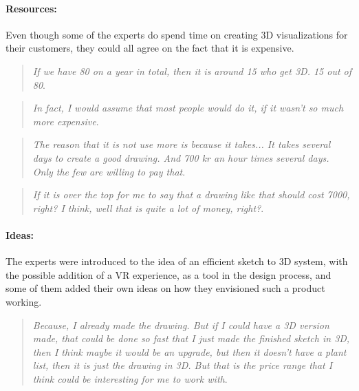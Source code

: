 		\paragraph*{Resources:}
		Even though some of the experts do spend time on creating 3D visualizations for their customers, they could all agree on the fact that it is expensive.\\
		
		\begin{quote}
			\textit{If we have 80 on a year in total, then it is around 15 who get 3D. 15 out of 80}\label{quote:expertRessources1}.\\
		\end{quote}
		
		\begin{quote}
			\textit{In fact, I would assume that most people would do it, if it wasn't so much more expensive}\label{quote:expertRessources2}.\\
		\end{quote}
		
		\begin{quote}
			\textit{The reason that it is not use more is because it takes... It takes several days to create a good drawing. And 700 kr an hour times several days. Only the few are willing to pay that}\label{quote:expertRessources3}.\\
		\end{quote}
		
		\begin{quote}
			\textit{If it is over the top for me to say that a drawing like that should cost 7000, right? I think, well that is quite a lot of money, right?}\label{quote:expertRessources4}.\\
		\end{quote}
		
		\paragraph*{Ideas:}
		The experts were introduced to the idea of an efficient sketch to 3D system, with the possible addition of a VR experience, as a tool in the design process, and some of them added their own ideas on how they envisioned such a product working.\\
		
		\begin{quote}
			\textit{Because, I already made the drawing. But if I could have a 3D version made, that could be done so fast that I just made the finished sketch in 3D, then I think maybe it would be an upgrade, but then it doesn't have a plant list, then it is just the drawing in 3D. But that is the price range that I think could be interesting for me to work with}\label{quote:expertIdeas1}.\\
		\end{quote}
		
